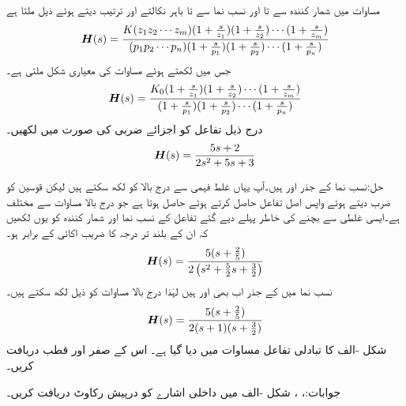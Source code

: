 مساوات  میں  شمار کنندہ سے  تا  اور نسب نما سے  تا  باہر نکالتے اور ترتیب دیتے ہوئے ذیل ملتا ہے
\begin{align*}
{\ensuremath{{\boldsymbol{H}}}}(s)=\frac{K(z_1 z_2 \cdots z_m) (1+\frac{s}{z_1})(1+\frac{s}{z_2})\cdots (1+\frac{s}{z_m})}{(p_1 p_2 \cdots p_n)(1+\frac{s}{p_1})(1+\frac{s}{p_2}) \cdots (1+\frac{s}{p_n})}
\end{align*}
جس میں  لکھتے ہوئے مساوات کی معیاری شکل ملتی ہے۔
\begin{align}\label{مساوات_تعددی_تبادلی_تفاعل_معیاری_صورت}
{\ensuremath{{\boldsymbol{H}}}}(s)=\frac{K_0 (1+\frac{s}{z_1})(1+\frac{s}{z_2})\cdots (1+\frac{s}{z_m})}{(1+\frac{s}{p_1})(1+\frac{s}{p_2}) \cdots (1+\frac{s}{p_n})}
\end{align}
درج ذیل تفاعل کو اجزائے ضربی کی صورت میں لکھیں۔
\begin{align*}
{\ensuremath{{\boldsymbol{H}}}}(s)=\frac{5s+2}{2s^2+5s+3}
\end{align*}

حل:نسب نما  کے جذر  اور  ہیں۔آپ یہاں غلط فہمی سے درج بالا کو  لکھ سکتے ہیں لیکن قوسین کو ضرب دیتے ہوئے واپس اصل تفاعل حاصل کرتے ہوئے  حاصل ہوتا ہے جو درج بالا مساوات سے مختلف ہے۔ایسی غلطی سے بچنے کی خاطر پہلے دیے گئے تفاعل کے نسب نما اور شمار کنندہ کو یوں لکھیں کہ  ان کے بلند تر  درجہ  کا  ضریب  اکائی کے برابر ہو۔ 
\begin{align*}
{\ensuremath{{\boldsymbol{H}}}}(s)=\frac{5(s+\frac{2}{5})}{2\left(s^2+\frac{5}{2}s+\frac{3}{2}\right)}
\end{align*}
نسب نما میں  کے جذر اب بھی  اور  ہیں لہٰذا درج بالا مساوات کو ذیل لکھ سکتے ہیں۔
\begin{align*}
{\ensuremath{{\boldsymbol{H}}}}(s)=\frac{5(s+\frac{2}{5})}{2(s+1)(s+\frac{3}{2})}
\end{align*}
شکل -الف کا تبادلی تفاعل مساوات  میں دیا گیا ہے۔ اس کے صفر اور قطب دریافت کریں۔

جوابات:، ، 
شکل -الف میں داخلی اشارے کو درپیش رکاوٹ دریافت کریں۔

